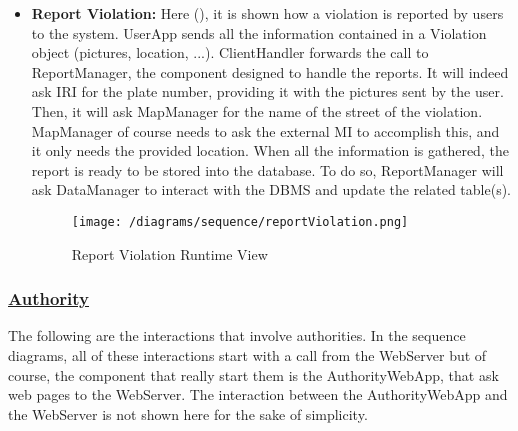 \begin{itemize}
				\FloatBarrier
				\newpage
			
				\item \textbf{Report Violation:} Here (), it is shown how a violation is reported by users to the system. UserApp sends all the information contained in a Violation object (pictures, location, ...). ClientHandler forwards the call to ReportManager, the component designed to handle the reports. It will indeed ask IRI for the plate number, providing it with the pictures sent by the user. Then, it will ask MapManager for the name of the street of the violation. MapManager of course needs to ask the external MI to accomplish this, and it only needs the provided location. When all the information is gathered, the report is ready to be stored into the database. To do so, ReportManager will ask DataManager to interact with the DBMS and update the related table(s).
				
				\begin{figure}[h!]
					\centering
					\texttt{[image: /diagrams/sequence/reportViolation.png]}
					\caption{\label{fig:reportViolationRuntime} Report Violation Runtime View}
				\end{figure}
			\end{itemize}
		
		\subsubsection[Authority]{\hyperlink{toc}{Authority}}
			\label{sec:authorityRuntimeView}
			
			The following are the interactions that involve authorities. In the sequence diagrams, all of these interactions start with a call from the WebServer but of course, the component that really start them is the AuthorityWebApp, that ask web pages to the WebServer. The interaction between the AuthorityWebApp and the WebServer is not shown here for the sake of simplicity.
			
